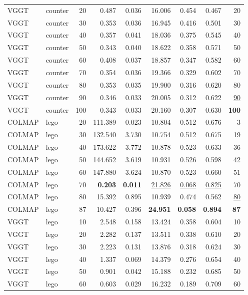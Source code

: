 \begin{table}[H]
\begin{tabular}{llrrrrrrr}
VGGT & counter & 20 & 0.487 & 0.036 & 16.006 & 0.454 & 0.467 & 20 \\
VGGT & counter & 30 & 0.353 & 0.036 & 16.945 & 0.416 & 0.501 & 30 \\
VGGT & counter & 40 & 0.357 & 0.041 & 18.036 & 0.375 & 0.545 & 40 \\
VGGT & counter & 50 & 0.343 & 0.040 & 18.622 & 0.358 & 0.571 & 50 \\
VGGT & counter & 60 & 0.408 & 0.037 & 18.857 & 0.347 & 0.582 & 60 \\
VGGT & counter & 70 & 0.354 & 0.036 & 19.366 & 0.329 & 0.602 & 70 \\
VGGT & counter & 80 & 0.353 & 0.035 & 19.900 & 0.316 & 0.620 & 80 \\
VGGT & counter & 90 & 0.346 & 0.033 & 20.005 & 0.312 & 0.622 & \underline{90} \\
VGGT & counter & 100 & 0.343 & 0.033 & 20.160 & 0.307 & 0.630 & \textbf{100} \\
\midrule
COLMAP & lego & 20 & 111.389 & 0.023 & 10.804 & 0.512 & 0.676 & 3 \\
COLMAP & lego & 30 & 132.540 & 3.730 & 10.754 & 0.512 & 0.675 & 19 \\
COLMAP & lego & 40 & 173.622 & 3.772 & 10.878 & 0.523 & 0.633 & 36 \\
COLMAP & lego & 50 & 144.652 & 3.619 & 10.931 & 0.526 & 0.598 & 42 \\
COLMAP & lego & 60 & 147.880 & 3.624 & 10.870 & 0.523 & 0.660 & 51 \\
COLMAP & lego & 70 & \textbf{0.203} & \textbf{0.011} & \underline{21.826} & \underline{0.068} & \underline{0.825} & 70 \\
COLMAP & lego & 80 & 15.392 & 0.895 & 10.939 & 0.474 & 0.562 & \underline{80} \\
COLMAP & lego & 87 & 10.427 & 0.396 & \textbf{24.951} & \textbf{0.058} & \textbf{0.894} & \textbf{87} \\
VGGT & lego & 10 & 2.548 & 0.158 & 13.424 & 0.358 & 0.604 & 10 \\
VGGT & lego & 20 & 2.282 & 0.137 & 13.511 & 0.338 & 0.610 & 20 \\
VGGT & lego & 30 & 2.223 & 0.131 & 13.876 & 0.318 & 0.624 & 30 \\
VGGT & lego & 40 & 1.337 & 0.069 & 14.379 & 0.276 & 0.654 & 40 \\
VGGT & lego & 50 & 0.901 & 0.042 & 15.188 & 0.232 & 0.685 & 50 \\
VGGT & lego & 60 & 0.603 & 0.029 & 16.232 & 0.189 & 0.709 & 60 \\

\end{tabular}
\end{table}
